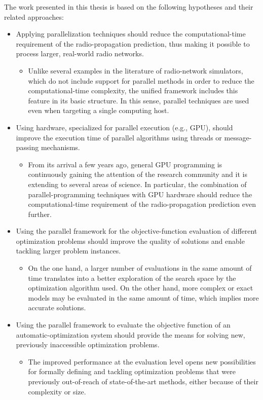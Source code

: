 The work presented in this thesis is based on the following hypotheses
and their related approaches:
\begin{itemize}
\item Applying parallelization techniques should reduce the computational-time
requirement of the radio-propagation prediction, thus making it possible
to process larger, real-world radio networks.

\begin{itemize}
\item Unlike several examples in the literature of radio-network simulators,
which do not include support for parallel methods in order to reduce
the computational-time complexity, the unified framework includes
this feature in its basic structure. In this sense, parallel techniques
are used even when targeting a single computing host.
\end{itemize}
\item Using hardware, specialized for parallel execution (e.g., GPU), should
improve the execution time of parallel algorithms using threads or
message-passing mechanisms.

\begin{itemize}
\item From its arrival a few years ago, general GPU programming is continuously
gaining the attention of the research community and it is extending
to several areas of science. In particular, the combination of parallel-programming
techniques with GPU hardware should reduce the computational-time
requirement of the radio-propagation prediction even further.
\end{itemize}
\item Using the parallel framework for the objective-function evaluation
of different optimization problems should improve the quality of solutions
and enable tackling larger problem instances.

\begin{itemize}
\item On the one hand, a larger number of evaluations in the same amount
of time translates into a better exploration of the search space by
the optimization algorithm used. On the other hand, more complex or
exact models may be evaluated in the same amount of time, which implies
more accurate solutions.
\end{itemize}
\item Using the parallel framework to evaluate the objective function of
an automatic-optimization system should provide the means for solving
new, previously inaccessible optimization problems.

\begin{itemize}
\item The improved performance at the evaluation level opens new possibilities
for formally defining and tackling optimization problems that were
previously out-of-reach of state-of-the-art methods, either because
of their complexity or size.
\end{itemize}
\end{itemize}

